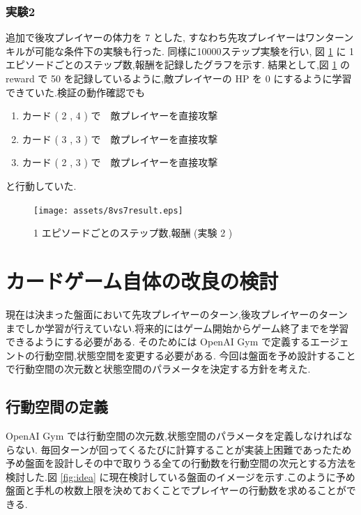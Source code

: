 \documentclass{jarticle}     %
\begin{document}
\subsubsection{実験2}
追加で後攻プレイヤーの体力を 7 とした, すなわち先攻プレイヤーはワンターンキルが可能な条件下の実験も行った.
同様に10000ステップ実験を行い, 図 \ref{fig:8vs7result} に 1 エピソードごとのステップ数,報酬を記録したグラフを示す.
結果として,図 \ref{fig:8vs7result} の reward で 50 を記録しているように,敵プレイヤーの HP を 0 にするように学習できていた.検証の動作確認でも
\begin{enumerate}
  \item カード ( 2 , 4 ) で　敵プレイヤーを直接攻撃
  \item カード ( 3 , 3 ) で　敵プレイヤーを直接攻撃
  \item カード ( 2 , 3 ) で　敵プレイヤーを直接攻撃
\end{enumerate}
と行動していた.

\begin{figure}[htbp]
  \centering
  \texttt{[image: assets/8vs7result.eps]}
  \caption{ 1 エピソードごとのステップ数,報酬 (実験 2 )}
  \label{fig:8vs7result}
\end{figure}

\section{カードゲーム自体の改良の検討}
現在は決まった盤面において先攻プレイヤーのターン,後攻プレイヤーのターンまでしか学習が行えていない.将来的にはゲーム開始からゲーム終了までを学習できるようにする必要がある.
そのためには OpenAI Gym で定義するエージェントの行動空間,状態空間を変更する必要がある.
今回は盤面を予め設計することで行動空間の次元数と状態空間のパラメータを決定する方針を考えた.

\subsection{行動空間の定義}
OpenAI Gym では行動空間の次元数,状態空間のパラメータを定義しなければならない. 毎回ターンが回ってくるたびに計算することが実装上困難であったため予め盤面を設計しその中で取りうる全ての行動数を行動空間の次元とする方法を検討した.図 \ref{fig:idea} に現在検討している盤面のイメージを示す.このように予め盤面と手札の枚数上限を決めておくことでプレイヤーの行動数を求めることができる.
\end{document}
